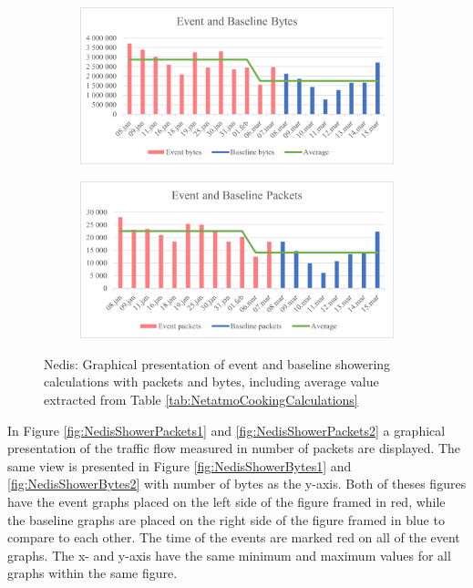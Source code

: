 \begin{figure}[H]
    \centering
    \begin{subfigure}{0.8\textwidth}
        \centering
        \includegraphics[width=1\hsize]{figures/Nedis_Shower_Calculations_Bytes.png} 
    \end{subfigure}
    \begin{subfigure}{0.8\textwidth}
        \centering
        \includegraphics[width=1\hsize]{figures/Nedis_Shower_Calculations_Packets.png} 
    \end{subfigure}
    \caption{Nedis: Graphical presentation of event and baseline showering calculations with packets and bytes, including average value extracted from Table \ref{tab:NetatmoCookingCalculations}}
    \label{fig:NedisShowerCalculations}
\end{figure}

In Figure \ref{fig:NedisShowerPackets1} and \ref{fig:NedisShowerPackets2} a graphical presentation of the traffic flow measured in number of packets are displayed. The same view is presented in Figure \ref{fig:NedisShowerBytes1} and \ref{fig:NedisShowerBytes2} with number of bytes as the y-axis. Both of theses figures have the event graphs placed on the left side of the figure framed in red, while the baseline graphs are placed on the right side of the figure framed in blue to compare to each other. The time of the events are marked red on all of the event graphs. The x- and y-axis have the same minimum and maximum values for all graphs within the same figure. 

